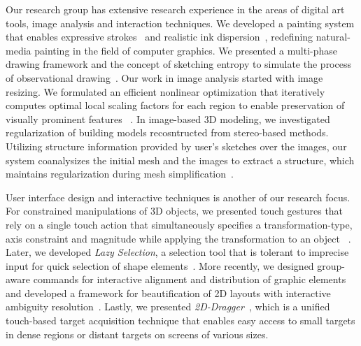 Our research group has extensive research experience in the areas of digital art tools, image analysis and interaction techniques.  We developed
a painting system that enables expressive strokes~\cite{Chu2004} and realistic ink
dispersion~\cite{Chu2005}, redefining natural-media painting in the field of computer graphics.
We presented a multi-phase drawing framework and the concept of sketching entropy to simulate the process of 
observational drawing~\cite{Liu2014}.
Our work in image analysis started with image resizing.
We formulated an efficient nonlinear optimization that iteratively computes optimal local scaling factors for each region to enable preservation of visually prominent features
~\cite{Wang2008}. 
In image-based 3D modeling, we investigated regularization of building models recosntructed from stereo-based methods.  Utilizing structure information provided by user's sketches over the images, 
our system coanalysizes the initial mesh and the images to extract a structure, which maintains regularization during mesh simplification~\cite{Wang:2016}. 

User interface design and interactive techniques is another of our research focus.
For constrained manipulations of 3D objects,
we presented touch gestures
that rely on a single touch action that simultaneously
specifies a transformation-type, axis constraint and magnitude while applying the transformation to an object
~\cite{Au2012}. 
Later, we developed 
{\em Lazy Selection}, a selection tool that is tolerant to imprecise input for 
quick selection of shape elements~\cite{Xu2012}.
More recently, we designed 
group-aware commands for interactive alignment and distribution of graphic
elements~\cite{Xu2015} and developed a 
framework for beautification of 2D layouts with interactive ambiguity resolution~\cite{Xu2014}.
Lastly, we presented \textit{2D-Dragger}~\cite{Su:2016}, which is a unified touch-based target acquisition technique that enables easy access to small targets in dense regions or distant targets on screens of various sizes. 
